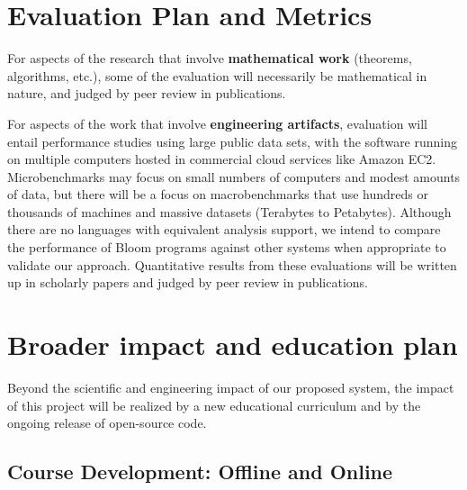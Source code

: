 \section{Evaluation Plan and Metrics}

For aspects of the research that involve \textbf{mathematical work} (theorems, algorithms, etc.), some of the evaluation will necessarily be mathematical in nature, and judged by peer review in publications.

For aspects of the work that involve \textbf{engineering artifacts}, evaluation will entail performance studies using large public data sets, with the software running on multiple computers hosted in commercial cloud services like Amazon EC2.  Microbenchmarks may focus on small numbers of computers and modest amounts of data, but there will be a focus on macrobenchmarks that use hundreds or thousands of machines and massive datasets (Terabytes to Petabytes).  Although there are no languages with equivalent analysis support, we intend to compare the performance of Bloom programs against other systems when appropriate to validate our approach. Quantitative results from these evaluations will be written up in scholarly papers and judged by peer review in publications.

\section{Broader impact and education plan}

Beyond the scientific and engineering impact of our proposed system,
the impact of this project will be realized by a new educational
curriculum and by the ongoing release of open-source code.  


\subsection{Course Development: Offline and Online}

